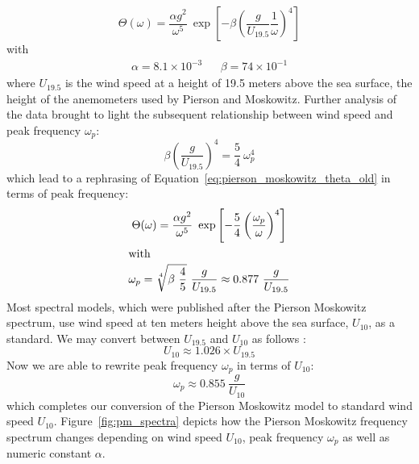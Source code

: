 \begin{equation}
\label{eq:pierson_moskowitz_theta_old}
 \Theta(\omega) = \frac{\alpha
g^2}{\omega^5}~\exp\left[-\beta\left(\frac{g}{U_{19.5}}\frac{1}{\omega}
\right)^4\right ]
\end{equation}
with
\begin{align*}
\alpha = 8.1 \times 10^{-3} && \beta = 74 \times 10^{-1}
\end{align*}
where $U_{19.5}$ is the wind speed at a height of 19.5 meters above the sea
surface, the height of the anemometers used by Pierson and Moskowitz. Further
analysis of the data \citep{alves:2003} brought to light the subsequent
relationship between wind speed and peak frequency $\omega_p$:
\begin{equation*}
 \beta\left(\frac{g}{U_{19.5}}\right)^4 = \frac{5}{4}~\omega_p^4
\end{equation*}
which lead to a rephrasing of Equation~\ref{eq:pierson_moskowitz_theta_old} in 
terms of peak frequency:
\begin{gather*}
 \Theta(\omega) = \frac{\alpha
g^2}{\omega^5}~\exp\left[-\frac{5}{4}\left(\frac{\omega_p}{\omega}
\right)^4\right ] \label{eq:pierson_moskowitz_theta}\\
\intertext{with}
\omega_p = \sqrt[4]{\beta~\frac{4}{5}}~\frac{g}{U_{19.5}} \approx
0.877~\frac{g}{U_{19.5}}
\end{gather*}
Most spectral models, which were published after the Pierson Moskowitz spectrum,
use wind speed at ten meters height above the sea surface, $U_{10}$, as a 
standard. We may convert between $U_{19.5}$ and $U_{10}$ as follows
\citep{alves:2003}:
\begin{equation}
 U_{10} \approx 1.026\times U_{19.5}
\end{equation}
Now we are able to rewrite peak frequency $\omega_p$ in terms of $U_{10}$:
\begin{equation*}
\label{eq:pm_omega_p_u10}
 \omega_p \approx 0.855~\frac{g}{U_{10}}
\end{equation*}
which completes our conversion of the Pierson Moskowitz model to standard wind 
speed $U_{10}$.
Figure~\ref{fig:pm_spectra} depicts how the Pierson Moskowitz 
frequency spectrum changes depending on wind speed $U_{10}$, peak frequency 
$\omega_p$ as well as numeric constant $\alpha$.
%
